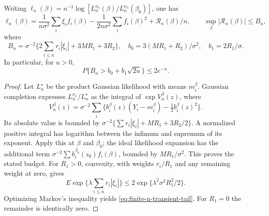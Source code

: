 \begin{lemma}
\label{lem:finite-n-exact-correction}
Writing \(\ell_n(\beta)=n^{-1}\log
[L_n^{\nu_n}(\beta)/L_n^{\nu_n}(\beta_0)]\), one has
\begin{equation}
 \ell_n(\beta)=\frac1{n\sigma^2}\sum_i\xi_if_i(\beta)
 -\frac1{2n\sigma^2}\sum_i f_i(\beta)^2+\mathcal R_n(\beta)/n,
 \qquad \sup_\beta|\mathcal R_n(\beta)|\le B_n,
 \label{eq:finite-n-exact-expansion}
\end{equation}
where
\[
 B_n=\sigma^{-2}\{2\sum_{i\le n}r_i|\xi_i|+3MR_1+3R_2\},\quad
 b_0=3(MR_1+R_2)/\sigma^2,\quad b_1=2R_1/\sigma.
\]
In particular, for \(u>0\),
\begin{equation}
 P\{B_n>b_0+b_1\sqrt{2u}\}\le2e^{-u}.
 \label{eq:finite-n-transient-tail}
\end{equation}
\end{lemma}
\begin{proof}
Let \(L_n^\star\) be the product Gaussian likelihood with means
\(m_i^\beta\). Gaussian completion expresses \(L_n^{\nu_n}/L_n^\star\)
as the integral of \(\exp V_n^\beta(z)\), where
\[
 V_n^\beta(z)=\sigma^{-2}\sum_i
 \{b_i^\beta(z)(Y_i-m_i^\beta)-\tfrac12 b_i^\beta(z)^2\}.
\]
Its absolute value is bounded by
\(\sigma^{-2}\{\sum r_i|\xi_i|+MR_1+3R_2/2\}\).
A normalized positive integral has logarithm between the infimum and
supremum of its exponent. Apply this at \(\beta\) and \(\beta_0\);
the ideal likelihood expansion has the additional term
\(\sigma^{-2}\sum b_i^{\beta_0}(z_0)f_i(\beta)\), bounded by
\(MR_1/\sigma^2\). This proves the stated budget.
For \(R_1>0\), convexity, with weights \(r_i/R_1\) and any remaining
weight at zero, gives
\[
 E\exp\{\lambda\sum_{i\le n}r_i|\xi_i|\}
 \le2\exp\{\lambda^2\sigma^2R_1^2/2\}.
\]
Optimizing Markov's inequality yields \eqref{eq:finite-n-transient-tail}.
For \(R_1=0\) the remainder is identically zero.
\end{proof}

